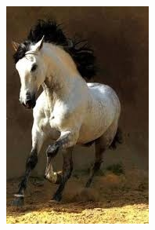 \begin{figure}[htbp]
    \centering
    \caption{
        Case study: \texttt{horse-139.jpg}, $k=15$.
        Original image, reconstructed image using k-means, reconstruction error,
        and clusterings in sample space.
    }
    \begin{subfigure}[t]{0.32\textwidth}
        \includegraphics[width=\linewidth]{../../rust_code/data/kmeans/horse-139.jpg}
    \end{subfigure}
    \begin{subfigure}[t]{0.32\textwidth}

\end{subfigure}
\end{figure}
